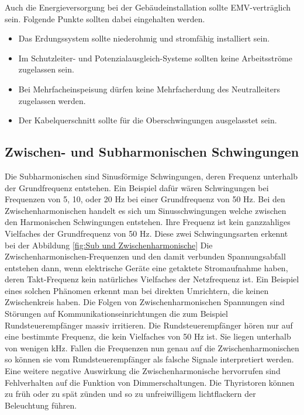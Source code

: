 Auch die Energieversorgung bei der Gebäudeinstallation sollte EMV-verträglich sein. Folgende Punkte sollten dabei eingehalten werden. 

\begin{itemize}
	\item Das Erdungssystem sollte niederohmig und stromfähig installiert sein.
	\item Im Schutzleiter- und Potenzialausgleich-Systeme sollten keine Arbeitsströme zugelassen sein.
	\item Bei Mehrfacheinspeisung dürfen keine Mehrfacherdung des Neutralleiters zugelassen werden.
	\item Der Kabelquerschnitt sollte für die Oberschwingungen ausgelasstet sein.
\end{itemize}  


\subsection{Zwischen- und Subharmonischen Schwingungen}

Die Subharmonischen sind Sinusförmige Schwingungen, deren Frequenz unterhalb der Grundfrequenz entstehen. Ein Beispiel dafür wären Schwingungen bei Frequenzen von 5, 10, oder 20 Hz bei einer Grundfrequenz von 50 Hz. Bei den Zwischenharmonischen handelt es sich um Sinusschwingungen welche zwischen den Harmonischen Schwingungen entstehen. Ihre Frequenz ist kein ganzzahliges Vielfaches der Grundfrequenz von 50 Hz. Diese zwei Schwingungsarten erkennt bei der Abbildung \ref{fig:Sub und Zwischenharmonische} Die Zwischenharmonischen-Frequenzen und den damit verbunden Spannungsabfall entstehen dann, wenn elektrische Geräte eine getaktete Stromaufnahme haben, deren Takt-Frequenz kein natürliches Vielfaches der Netzfrequenz ist. Ein Beispiel eines solchen Phänomen erkennt man bei direkten Umrichtern, die keinen Zwischenkreis haben. Die Folgen von Zwischenharmonischen Spannungen sind Störungen auf Kommunikationseinrichtungen die zum Beispiel Rundsteuerempfänger massiv irritieren. Die Rundsteuerempfänger hören nur auf eine bestimmte Frequenz, die kein Vielfaches von 50 Hz ist. Sie liegen unterhalb von wenigen kHz. Fallen die Frequenzen nun genau auf die Zwischenharmonischen so können sie vom Rundsteuerempfänger als falsche Signale interpretiert werden. Eine weitere negative Auswirkung die Zwischenharmonische hervorrufen sind Fehlverhalten auf die Funktion von Dimmerschaltungen. Die Thyristoren können zu früh oder zu spät zünden und so zu unfreiwilligem lichtflackern der Beleuchtung führen. 

